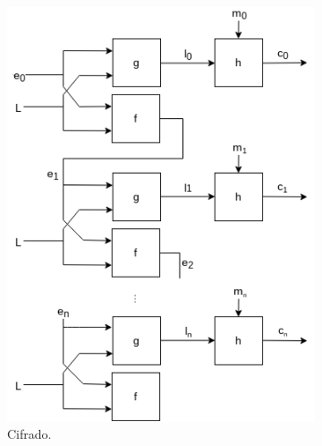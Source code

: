 \begin{figure}[H]
  \centering
  \begin{subfigure}{0.45\textwidth}
    \begin{center}
      \includegraphics[width=0.9\linewidth]
        {contenidos/antecedentes/cifrados_de_flujo/diagramas/sincrono_cifrado.png}
      \caption{Cifrado.}
    \end{center}
  \end{subfigure}
  \begin{subfigure}{0.45\textwidth}
    \begin{center}

\end{center}
\end{subfigure}
\end{figure}
